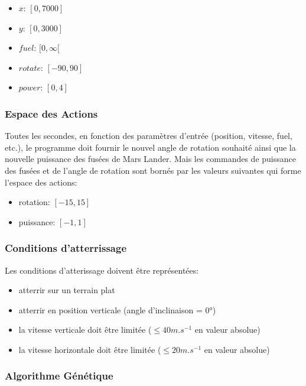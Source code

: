 \documentclass[french,a4paper,10pt,twocolumn]{article}
\begin{document}
\begin{itemize}
    \item $x$: $[0, 7000]$
    \item $y$: $[0, 3000]$
    \item $fuel$: $ [0, \infty [ $ 
    \item $rotate$: $[-90, 90]$
    \item $power$: $[0, 4]$
\end{itemize}

\subsubsection{Espace des Actions}

Toutes les secondes, en fonction des paramètres d’entrée (position, vitesse, fuel, etc.), 
le programme doit fournir le nouvel angle de rotation souhaité ainsi que la nouvelle puissance des fusées de Mars Lander.
Mais les commandes de puissance des fusées et de l’angle de rotation sont bornés par les valeurs suivantes qui forme l'espace des actions:
\begin{itemize}
    \item rotation: $[-15, 15]$ 
    \item puissance: $[-1, 1]$
\end{itemize}

\subsubsection{Conditions d'atterrissage}

Les conditions d'atterissage doivent être représentées:
\begin{itemize}
    \item atterrir sur un terrain plat
    \item atterrir en position verticale (angle d'inclinaison = 0°)
    \item la vitesse verticale doit être limitée ($\le 40m.s^{-1}$ en valeur absolue)
    \item la vitesse horizontale doit être limitée ($\le 20m.s^{-1}$ en valeur absolue)
\end{itemize}

\subsubsection{Algorithme Génétique}
\end{document}
